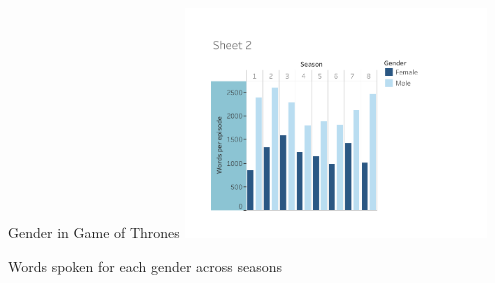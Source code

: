 \documentclass[aspectratio=169,usenames,dvipsnames]{beamer}
\begin{document}
\begin{frame}{Gender in Game of Thrones}\centering
    \includegraphics[width=0.6\textwidth]{fig/got}

    Words spoken for each gender across seasons
\end{frame}
\end{document}
